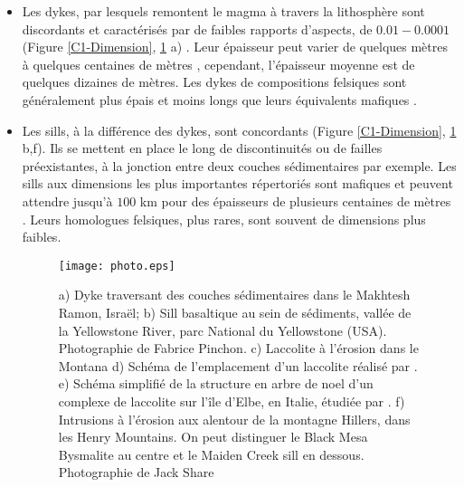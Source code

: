 \begin{itemize}
\item  Les  dykes,  par  lesquels  remontent le  magma  à  travers  la
  lithosphère sont discordants et caractérisés par de faibles rapports
  d'aspects,    de     $0.01-0.0001$    (Figure    \ref{C1-Dimension},
  \ref{C1-picture}                                                  a)
  \citep{Rubin:1995upa,Schultz:2008ih,Kavanagh:2011kf}.           Leur
  épaisseur peut  varier de  quelques mètres  à quelques  centaines de
  mètres       \citep{Walker:1989jq,Krumbholz:2014dj},      cependant,
  l'épaisseur moyenne est de quelques dizaines de mètres. Les dykes de
  compositions felsiques  sont généralement plus épais  et moins longs
  que leurs équivalents mafiques \citep{Rubin:1995upa}.

\item Les sills,  à la différence des dykes,  sont concordants (Figure
  \ref{C1-Dimension}, \ref{C1-picture} b,f).  Ils  se mettent en place
  le long de discontinuités ou de failles préexistantes, à la jonction
  entre  deux  couches  sédimentaires  par  exemple.   Les  sills  aux
  dimensions les plus importantes répertoriés sont mafiques et peuvent
  attendre jusqu'à $100$ km pour des épaisseurs de plusieurs centaines
  de  mètres  \citep{Cruden:tg}.   Leurs  homologues  felsiques,  plus
  rares, sont souvent de dimensions plus faibles.

  \begin{figure}[htpb]
    \begin{center}
      \graphicspath{ {/Users/thorey/Documents/These/Manuscript/Figure/Chapter1/} }
      \texttt{[image: photo.eps]}
      \caption{a) Dyke  traversant des  couches sédimentaires  dans le
        Makhtesh  Ramon,  Israël;  b)   Sill  basaltique  au  sein  de
        sédiments, vallée  de la  Yellowstone River, parc  National du
        Yellowstone  (USA).   Photographie  de  Fabrice  Pinchon.   c)
        Laccolite   à  l'érosion   dans  le   Montana  d)   Schéma  de
        l'emplacement       d'un      laccolite       réalisé      par
        \citet{Gilbert:1877uk}. e) Schéma simplifié de la structure en
        arbre de noel d'un complexe  de laccolite sur l'île d'Elbe, en
        Italie,  étudiée par  \citet{Rocchi:2010dn}.  f)  Intrusions à
        l'érosion aux alentour  de la montagne Hillers,  dans les Henry
        Mountains.   On peut  distinguer  le Black  Mesa Bysmalite  au
        centre et  le Maiden Creek  sill en dessous.   Photographie de
        Jack Share}
      \label{C1-picture}
    \end{center}
  \end{figure}


\end{itemize}
